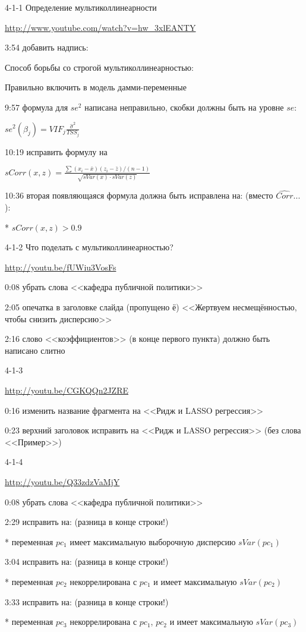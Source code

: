 \documentclass[12pt,a4paper]{article}
\renewcommand{\b}{\beta}
\newcommand{\s}{\sigma}
\newcommand{\hb}{\hat{\b}}
\newcommand{\hs}{\hat{\s}}
\begin{document}
4-1-1 Определение мультиколлинеарности

\url{http://www.youtube.com/watch?v=hw_3xlEANTY}

3:54 добавить надпись:

Способ борьбы со строгой мультиколлинеарностью:

Правильно включить в модель дамми-переменные

9:57 формула для $se^2$ написана неправильно, скобки должны быть на уровне $se$:

$se^2(\hb_j)=VIF_j \frac{\hs^2}{TSS_j}$

10:19 исправить формулу на

$sCorr(x,z)=\frac{\sum (x_i - \bar{x}) (z_i - \bar{z}) / (n-1) }{\sqrt{sVar(x) \cdot sVar(z)}}$

10:36 вторая появляющаяся формула должна быть исправлена на: (вместо $\widehat{Corr}...$):

* $sCorr(x,z)>0.9$    

4-1-2 Что поделать с мультиколлинеарностью?

\url{http://youtu.be/fUWiu3VosFs}

0:08 убрать слова <<кафедра публичной политики>>

2:05 опечатка в  заголовке слайда (пропущено ё) <<Жертвуем несмещённостью, чтобы снизить дисперсию>>

2:16 слово <<коэффициентов>> (в конце первого пункта) должно быть написано слитно

4-1-3 

\url{http://youtu.be/CGKQQn2JZRE}

0:16 изменить название фрагмента на <<Ридж и LASSO регрессия>> 

0:23 верхний заголовок исправить на <<Ридж и LASSO регрессия>> (без слова <<Пример>>)

4-1-4

\url{http://youtu.be/Q33zdzVaMjY}

0:08 убрать слова <<кафедра публичной политики>>

2:29 исправить на: (разница в конце строки!)

* переменная $pc_1$ имеет максимальную выборочную дисперсию $sVar(pc_1)$

3:04 исправить на: (разница в конце строки!)

* переменная $pc_2$ некоррелирована с $pc_1$ и имеет максимальную $sVar(pc_2)$

3:33 исправить на: (разница в конце строки!)

* переменная $pc_3$ некоррелирована с $pc_1$, $pc_2$ и имеет максимальную $sVar(pc_3)$
\end{document}
